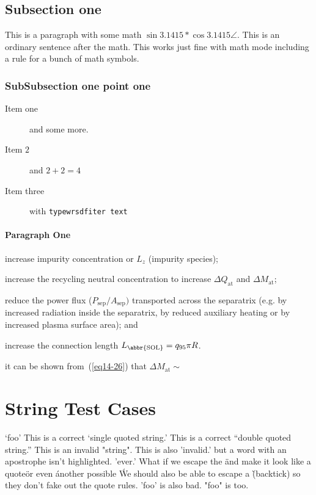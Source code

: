 \documentclass[letter]{article}
\begin{document}
\subsection{Subsection one}\label{sec:testLabel}
This is a paragraph with some math $ \sin{3.1415} * \cos{3.1415} \angle  $.  This is an ordinary sentence after the math.  This works just fine with math mode including a rule for a bunch of math symbols.

\subsubsection{SubSubsection one point one}
\begin{description}
    \item[Item one]  and some more.
    \item[Item $2$] and $2+2 = 4$
    \item[Item three] with \texttt{typewrsdfiter text}
\end{description}

\paragraph{Paragraph One}

\begin{inparaenum}
  \item increase impurity concentration or $L_{z}$ (impurity species);
  \item increase the recycling neutral concentration to increase $\Delta
    Q_{\text{at}}$ and $\Delta M_{\text{at}}$; 
  \item reduce the power flux
    ($P_{\text{sep}} / A_{\text{sep}})$ transported across the separatrix
    (e.g.  by increased radiation inside the separatrix, by reduced auxiliary
    heating or by increased plasma surface area); and \item increase the
    connection length $L_{\text{\abbr{SOL}}} = q_{95}\pi R$.
\end{inparaenum}
it can be shown from~(\ref{eq14-26}) that $\Delta M_{\text{at}} \sim$

\section{String Test Cases}

`foo' This is a correct `single quoted string.'  This is a correct ``double quoted string.''
This is an invalid "string".  This is also 'invalid.'  but a word with an apostrophe isn't highlighted. 'ever.'  What if we escape the \"and make it look like a quote\"  or even \' another possible \'  We should also be able to escape a \` (backtick) so they don't fake out the quote rules.
'foo' is also bad.
"foo" is too.
\end{document}
